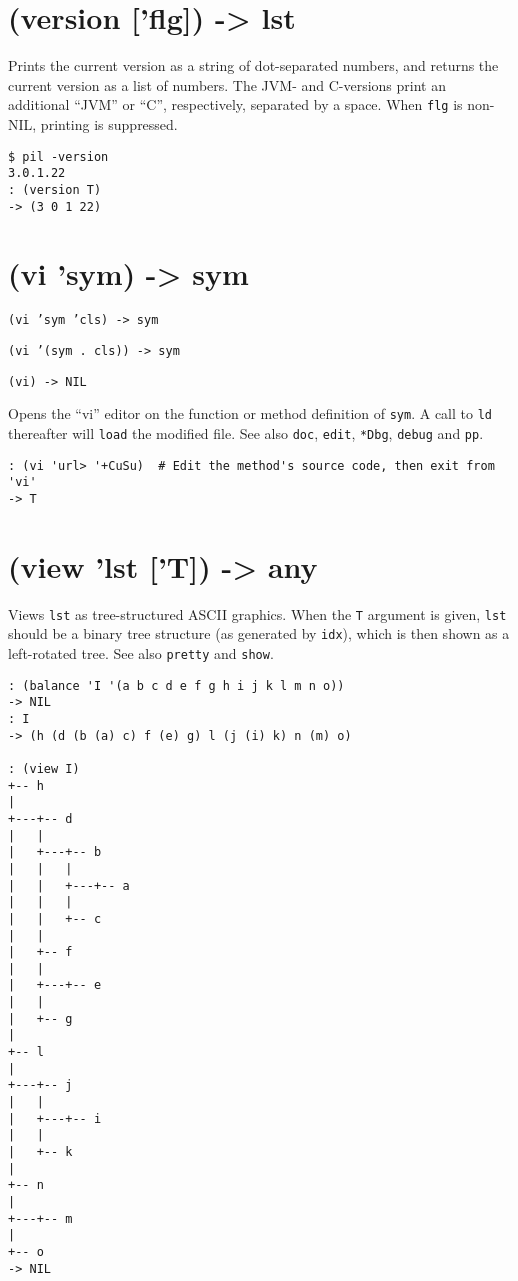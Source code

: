 {{{{{{{{ 
\section{(version ['flg]) -> lst}
\label{sec-8-1-22-5}


Prints the current version as a string of dot-separated numbers, and
returns the current version as a list of numbers. The JVM- and
C-versions print an additional ``JVM'' or ``C'', respectively, separated by
a space. When \texttt{flg} is non-NIL, printing is suppressed.


\begin{verbatim}
$ pil -version
3.0.1.22
: (version T)
-> (3 0 1 22)
\end{verbatim}

 
\section{(vi 'sym) -> sym}
\label{sec-8-1-22-6}


\texttt{(vi 'sym 'cls) -> sym}

\texttt{(vi '(sym . cls)) -> sym}

\texttt{(vi) -> NIL}

Opens the ``vi'' editor on the function or method definition of \texttt{sym}. A
call to \texttt{ld} thereafter will \texttt{load} the modified file. See also \texttt{doc},
\texttt{edit}, \texttt{*Dbg}, \texttt{debug} and \texttt{pp}.


\begin{verbatim}
: (vi 'url> '+CuSu)  # Edit the method's source code, then exit from 'vi'
-> T
\end{verbatim}

 
\section{(view 'lst ['T]) -> any}
\label{sec-8-1-22-7}


Views \texttt{lst} as tree-structured ASCII graphics. When the \texttt{T} argument is
given, \texttt{lst} should be a binary tree structure (as generated by \texttt{idx}),
which is then shown as a left-rotated tree. See also \texttt{pretty} and
\texttt{show}.


\begin{verbatim}
: (balance 'I '(a b c d e f g h i j k l m n o))
-> NIL
: I
-> (h (d (b (a) c) f (e) g) l (j (i) k) n (m) o)

: (view I)
+-- h
|
+---+-- d
|   |
|   +---+-- b
|   |   |
|   |   +---+-- a
|   |   |
|   |   +-- c
|   |
|   +-- f
|   |
|   +---+-- e
|   |
|   +-- g
|
+-- l
|
+---+-- j
|   |
|   +---+-- i
|   |
|   +-- k
|
+-- n
|
+---+-- m
|
+-- o
-> NIL


\end{verbatim}}}}}}}}}
